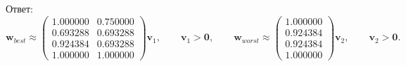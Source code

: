 Ответ:
$$\bm{w}_{best} \approx \begin{pmatrix}
1.000000 & 0.750000\\
0.693288 & 0.693288\\
0.924384 & 0.693288\\
1.000000 & 1.000000
\end{pmatrix}\bm{v}_{1},
\qquad
\bm{v}_{1}
>
\bm{0},
\qquad
\bm{w}_{worst} \approx \begin{pmatrix}
1.000000\\
0.924384\\
0.924384\\
1.000000
\end{pmatrix}\bm{v}_{2},
\qquad
\bm{v}_{2}
>
\bm{0}.
$$
